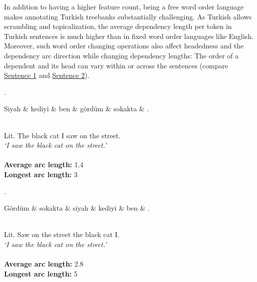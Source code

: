 \documentclass{elektr}
\begin{document}
In addition to having a higher feature count, being a free word order language makes annotating Turkish treebanks substantially challenging.
As Turkish allows scrambling and topicalization, the average dependency length per token in Turkish sentences is much higher than in fixed word order languages like English.
Moreover, such word order changing operations also affect headedness and the dependency arc direction while changing dependency lengths: The order of a dependent and its head can vary within or across the sentences (compare \hyperref[dep1]{Sentence 1} and \hyperref[dep2]{Sentence 2}).

\begin{multicols}{2}
\vspace*{\fill} 
\ex. \label{dep1}
\begin{dependency}
   \begin{deptext}
      Siyah \& kediyi \& ben \& gördüm \& sokakta \& . \\
   \end{deptext}
\end{dependency} \\
Lit. The black cat I saw on the street. \\
\textit{‘I saw the black cat on the street.’} \\
\vspace{.05cm} \\
\textbf{Average arc length:} 1.4\\
\textbf{Longest arc length:} 3\\
\columnbreak

\ex. \label{dep2}
\begin{dependency}
   \begin{deptext}
      Gördüm \& sokakta \& siyah \& kediyi \& ben \& . \\
   \end{deptext}
\end{dependency} \\
Lit. Saw on the street the black cat I. \\
\textit{‘I saw the black cat on the street.’} \\
\vspace{.05cm} \\
\textbf{Average arc length:} 2.8\\
\textbf{Longest arc length:} 5

\end{multicols}
\end{document}
